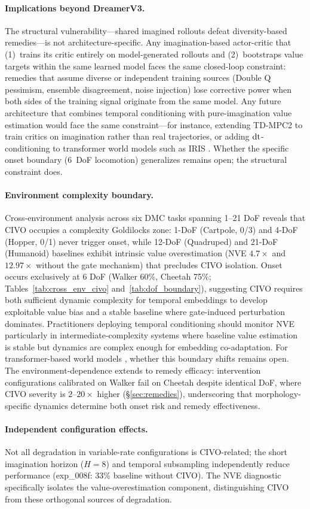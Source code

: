 \paragraph{Implications beyond DreamerV3.}
 The structural vulnerability---shared imagined rollouts defeat diversity-based remedies---is not architecture-specific. Any imagination-based actor-critic that (1)~trains its critic entirely on model-generated rollouts and (2)~bootstraps value targets within the same learned model faces the same closed-loop constraint: remedies that assume diverse or independent training sources (Double Q pessimism, ensemble disagreement, noise injection) lose corrective power when both sides of the training signal originate from the same model. Any future architecture that combines temporal conditioning with pure-imagination value estimation would face the same constraint---for instance, extending TD-MPC2 \citep{hansen2024tdmpc2} to train critics on imagination rather than real trajectories, or adding $\mathrm{dt}$-conditioning to transformer world models such as IRIS \citep{micheli2023iris}. Whether the specific onset boundary (6~DoF locomotion) generalizes remains open; the structural constraint does.

\paragraph{Environment complexity boundary.}
 Cross-environment analysis across six DMC tasks spanning 1--21 DoF reveals that CIVO occupies a complexity Goldilocks zone: 1-DoF (Cartpole, 0/3) and 4-DoF (Hopper, 0/1) never trigger onset, while 12-DoF (Quadruped) and 21-DoF (Humanoid) baselines exhibit intrinsic value overestimation (NVE $4.7\times$ and $12.97\times$ without the gate mechanism) that precludes CIVO isolation. Onset occurs exclusively at 6 DoF (Walker 60\%, Cheetah 75\%; Tables~\ref{tab:cross_env_civo} and~\ref{tab:dof_boundary}), suggesting CIVO requires both sufficient dynamic complexity for temporal embeddings to develop exploitable value bias and a stable baseline where gate-induced perturbation dominates. Practitioners deploying temporal conditioning should monitor NVE particularly in intermediate-complexity systems where baseline value estimation is stable but dynamics are complex enough for embedding co-adaptation. For transformer-based world models \citep{micheli2023iris}, whether this boundary shifts remains open. The environment-dependence extends to remedy efficacy: intervention configurations calibrated on Walker fail on Cheetah despite identical DoF, where CIVO severity is $2$--$20\times$ higher (\S\ref{sec:remedies}), underscoring that morphology-specific dynamics determine both onset risk and remedy effectiveness.

\paragraph{Independent configuration effects.}
Not all degradation in variable-rate configurations is CIVO-related; the short imagination horizon ($H{=}8$) and temporal subsampling independently reduce performance (exp\_008f: 33\% baseline without CIVO). The NVE diagnostic specifically isolates the value-overestimation component, distinguishing CIVO from these orthogonal sources of degradation.
